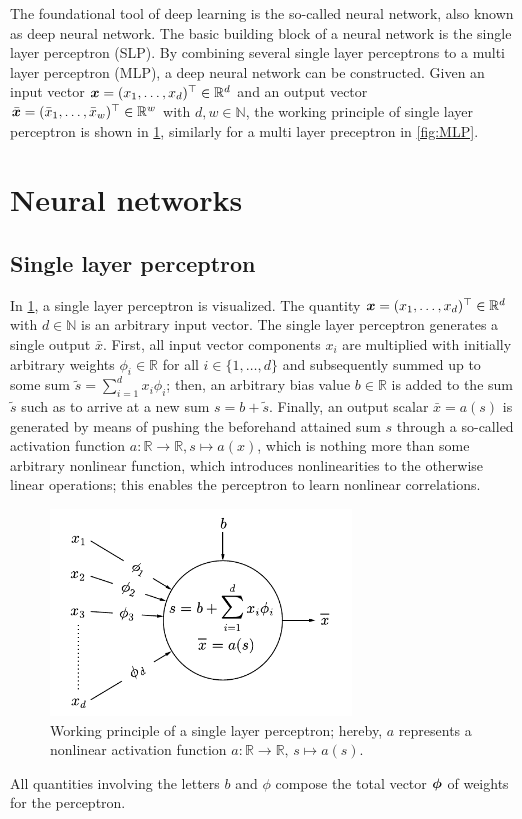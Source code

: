 \documentclass[a4paper,12pt]{report}
\begin{document}
The foundational tool of deep learning is the so-called neural network, also known as deep neural network. The basic building block of a neural network is the single layer perceptron (SLP). By combining several single layer perceptrons to a multi layer perceptron (MLP), a deep neural network can be constructed. Given an input vector $\bm{x} = (x_1, \dots, x_d)^\top \in\mathbb{R}^d$ and an output vector $\bar{\bm{x}} = (\bar{x}_1,\dots,\bar{x}_w)^\top \in \mathbb{R}^w$ with $d,w \in \mathbb{N}$, the working principle of single layer perceptron is shown in \cref{fig:SLP}, similarly for a multi layer preceptron in \cref{fig:MLP}.

\section{Neural networks}
\subsection{Single layer perceptron}
In \cref{fig:SLP}, a single layer perceptron is visualized. The quantity $\bm{x} = (x_1, \dots, x_d)^\top \in\mathbb{R}^d$ with $d \in \mathbb{N}$ is an arbitrary input vector. The single layer perceptron generates a single output $\bar{x}$. First, all input vector components $x_i$ are multiplied with initially arbitrary weights $\phi_i \in \mathbb{R}$ for all $i \in \{1,\dots,d\}$ and subsequently summed up to some sum $\tilde{s} = \sum_{i=1}^{d}x_i\phi_i$; then, an arbitrary bias value $b \in \mathbb{R}$ is added to the sum $\tilde{s}$ such as to arrive at a new sum $s = b + \tilde{s}$. Finally, an output scalar $\bar{x} = a(s)$ is generated by means of pushing the beforehand attained sum $s$ through a so-called activation function $a:\mathbb{R}\rightarrow \mathbb{R}, s\mapsto a(x)$, which is nothing more than some arbitrary nonlinear function, which introduces nonlinearities to the otherwise linear operations; this enables the perceptron to learn nonlinear correlations.
\begin{figure}[h!]
\centering
\includegraphics[width=8cm]{figures/SLP.pdf}
\caption{Working principle of a single layer perceptron; hereby, $a$ represents a nonlinear activation function $a :\mathbb{R}\rightarrow \mathbb{R},\, s\mapsto a(s)$.}
\label{fig:SLP}
\end{figure}
All quantities involving the letters $b$ and $\phi$ compose the total vector $\bm{\phi}$ of weights for the perceptron.
\end{document}
